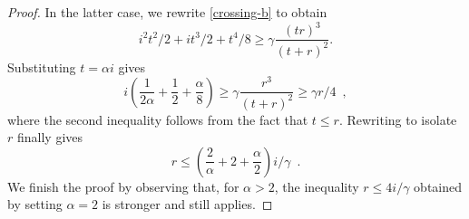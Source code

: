 \documentclass{patmorin}
\newcommand{\const}{268.19}
\begin{document}
\begin{proof}
In the latter case, we rewrite \eqref{crossing-b} to obtain
\[ i^2t^2/2 + it^3/2 + t^4/8 \ge \gamma\frac{(tr)^3}{(t+r)^2} .  \]
Substituting $t=\alpha i$ gives
\[ i\left(\frac{1}{2\alpha} 
    + \frac{1}{2}+\frac{\alpha}{8}\right) 
      \ge \gamma \frac{r^3}{(t+r)^2} \ge \gamma r/ 4 \enspace ,
\]
where the second inequality follows from the fact that $t \le r$.  Rewriting to isolate $r$ finally gives
\[
  r \le \left(\frac{2}{\alpha} + 2 +\frac{\alpha}{2}\right)i/\gamma \enspace .
\]
We finish the proof by observing that, for $\alpha > 2$, the inequality $r\le 4i/\gamma$ obtained by setting $\alpha=2$ is stronger and still applies.
%
%
%
%

\end{proof}
\end{document}
